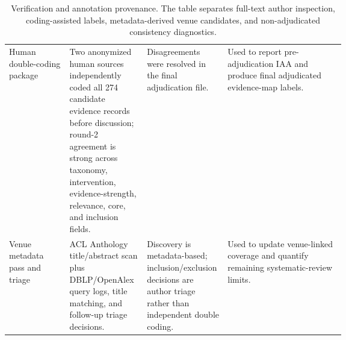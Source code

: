 \documentclass[11pt]{article}
\begin{document}
\begin{table}[t]
\begin{tabularx}{\linewidth}{>{\raggedright\arraybackslash}p{0.18\linewidth}>{\raggedright\arraybackslash}p{0.23\linewidth}>{\raggedright\arraybackslash}p{0.24\linewidth}X}
Human double-coding package & Two anonymized human sources independently coded all 274 candidate evidence records before discussion; round-2 agreement is strong across taxonomy, intervention, evidence-strength, relevance, core, and inclusion fields. & Disagreements were resolved in the final adjudication file. & Used to report pre-adjudication IAA and produce final adjudicated evidence-map labels. \\
Venue metadata pass and triage & ACL Anthology title/abstract scan plus DBLP/OpenAlex query logs, title matching, and follow-up triage decisions. & Discovery is metadata-based; inclusion/exclusion decisions are author triage rather than independent double coding. & Used to update venue-linked coverage and quantify remaining systematic-review limits. \\
\bottomrule
\end{tabularx}
\caption{Verification and annotation provenance. The table separates full-text author inspection, coding-assisted labels, metadata-derived venue candidates, and non-adjudicated consistency diagnostics.}
\label{tab:verification-provenance}
\end{table}

\end{document}
